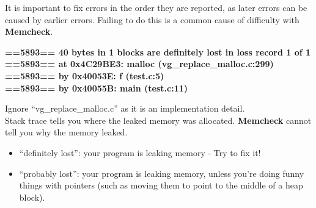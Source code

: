 \documentclass{article}
\begin{document}
It is important to fix errors in the order they are reported, as later errors can be caused by earlier errors. Failing to do this is a common cause of difficulty with \textbf{Memcheck}.
\begin{flushleft}
    \textbf{==5893== 40 bytes in 1 blocks are definitely lost in loss record 1 of 1 \\ ==5893== \hspace{15pt} at 0x4C29BE3: malloc (vg\_replace\_malloc.c:299) \\ ==5893== \hspace{15pt} by 0x40053E: f (test.c:5) \\ ==5893== \hspace{15pt} by 0x40055B: main (test.c:11)}
\end{flushleft}
Ignore ``vg\_replace\_malloc.c'' as it is an implementation detail. \\
Stack trace tells you where the leaked memory was allocated. \textbf{Memcheck} cannot tell you why the memory leaked.
\begin{itemize}
\item ``definitely lost'': your program is leaking memory - Try to fix it!
\item ``probably lost'': your program is leaking memory, unless you're doing funny things with pointers (such as moving them to point to the middle of a heap block).
\end{itemize}
\end{document}
